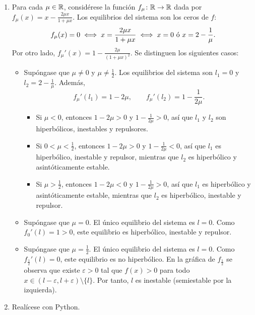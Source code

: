 \documentclass[11pt]{report}
\begin{document}
\begin{solution}
    \hfill
    \begin{enumerate}
        \item Para cada $\mu\in\mathbb R$, considérese la función $f_\mu\colon\mathbb R\to\mathbb R$ dada por $f_\mu(x) = x-\frac{2\mu x}{1+\mu x}$. Los equilibrios del sistema son los ceros de $f$:
        \begin{align*}
            f_\mu(x) = 0 \iff x = \frac{2\mu x}{1+\mu x} \iff x= 0 \textup{ ó } x = 2-\frac{1}{\mu}.
        \end{align*}
        Por otro lado, $f_\mu'(x) = 1-\frac{2\mu}{(1+\mu x)^2}$. Se distinguen los siguientes casos:
        \begin{itemize}
            \item Supóngase que $\mu \neq 0$ y $\mu \neq \frac{1}{2}$. Los equilibrios del sistema son $l_1 = 0$ y $l_2 = 2-\frac{1}{\mu}$. Además,
            \[f_\mu'(l_1) = 1-2\mu, \qquad f_\mu'(l_2) = 1-\frac{1}{2\mu}.\]
            \begin{itemize}
                \item Si $\mu < 0$, entonces $1-2\mu > 0$ y $1-\frac{1}{2\mu} > 0$, así que $l_1$ y $l_2$ son hiperbólicos, inestables y repulsores.
                \item Si $0 < \mu < \frac{1}{2}$, entonces $1-2\mu > 0$ y $1-\frac{1}{2\mu} < 0$, así que $l_1$ es hiperbólico, inestable y repulsor, mientras que $l_2$ es hiperbólico y asintóticamente estable.
                \item Si $\mu > \frac{1}{2}$, entonces $1-2\mu < 0$ y $1-\frac{1}{2\mu} > 0$, así que $l_1$ es hiperbólico y asintóticamente estable, mientras que $l_2$ es hiperbólico, inestable y repulsor.
            \end{itemize} 
            \item Supóngase que $\mu = 0$. El único equilibrio del sistema es $l = 0$. Como $f_0'(l) = 1 > 0$, este equilibrio es hiperbólico, inestable y repulsor.
            \item Supóngase que $\mu = \frac{1}{2}$. El único equilibrio del sistema es $l = 0$. Como $f_{\frac{1}{2}}'(l) = 0$, este equilibrio es no hiperbólico. En la gráfica de $f_{\frac{1}{2}}$ se observa que existe $\varepsilon > 0$ tal que $f(x) > 0$ para todo $x \in (l-\varepsilon,l+\varepsilon)\setminus\{l\}$. Por tanto, $l$ es inestable (semiestable por la izquierda).
        \end{itemize}
        \item Realícese con Python.
    \end{enumerate}
\end{solution}
\end{document}
